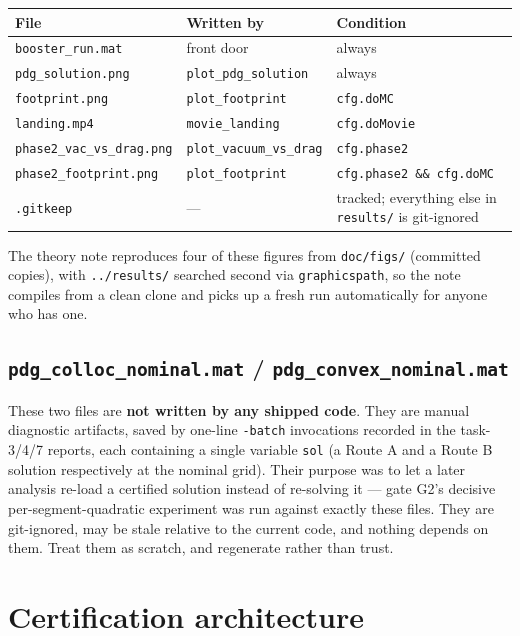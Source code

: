 \documentclass[11pt]{article}
\newcommand{\file}[1]{\texttt{#1}}
\begin{document}
\begin{center}
\begin{tabular}{@{}lL{5.0cm}L{4.4cm}@{}}
\toprule
File & Written by & Condition \\
\midrule
\texttt{booster\_run.mat} & front door & always \\
\texttt{pdg\_solution.png} & \texttt{plot\_pdg\_solution} & always \\
\texttt{footprint.png} & \texttt{plot\_footprint} & \texttt{cfg.doMC} \\
\texttt{landing.mp4} & \texttt{movie\_landing} & \texttt{cfg.doMovie} \\
\texttt{phase2\_vac\_vs\_drag.png} & \texttt{plot\_vacuum\_vs\_drag} &
  \texttt{cfg.phase2} \\
\texttt{phase2\_footprint.png} & \texttt{plot\_footprint} &
  \texttt{cfg.phase2 \&\& cfg.doMC} \\
\texttt{.gitkeep} & --- & tracked; everything else in \file{results/} is
  git-ignored \\
\bottomrule
\end{tabular}
\end{center}

The theory note reproduces four of these figures from \file{doc/figs/}
(committed copies), with \file{../results/} searched second via
\texttt{graphicspath}, so the note compiles from a clean clone and picks up
a fresh run automatically for anyone who has one.

\subsection{\texttt{pdg\_colloc\_nominal.mat} / \texttt{pdg\_convex\_nominal.mat}}

These two files are \textbf{not written by any shipped code}. They are
manual diagnostic artifacts, saved by one-line \texttt{-batch} invocations
recorded in the task-3/4/7 reports, each containing a single variable
\texttt{sol} (a Route A and a Route B solution respectively at the nominal
grid). Their purpose was to let a later analysis re-load a certified
solution instead of re-solving it --- gate G2's decisive per-segment-quadratic
experiment was run against exactly these files. They are git-ignored, may be
stale relative to the current code, and nothing depends on them. Treat them
as scratch, and regenerate rather than trust.

\section{Certification architecture}
\label{sec:certify}
\end{document}
